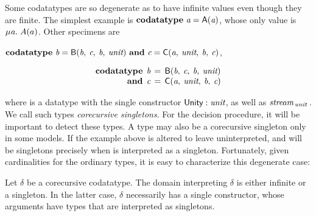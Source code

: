 Some codatatypes are so degenerate as to have infinite values
even though they are finite. The simplest example is
\vthinspace$\textbf{codatatype}~\textit{a} = \textsf{A}(\textit{a})$, whose
only value is $\MU a.\; A(a)$. Other specimens are
\begin{paper}%
\vthinspace$\textbf{codatatype}~\textit{b} = \textsf{B}(\textit{b},\: \textit{c},\: \textit{b},\: \textit{unit})
~\textbf{and}~ \textit{c} = \textsf{C}(\textit{a},\: \textit{unit},\: \textit{b},\: \textit{c})$,
\end{paper}%
\begin{report}%
\[\begin{aligned}[t]
      \textbf{codatatype}\;\, \textit{b} & \,=\, \textsf{B}(\textit{b},\: \textit{c},\: \textit{b},\: \textit{unit}) \\[-1\jot]
      \textbf{and}\;\, \textit{c} & \,=\, \textsf{C}(\textit{a},\: \textit{unit},\: \textit{b},\: \textit{c})
\end{aligned}
\]
\end{report}%
where  is a datatype with the single constructor $\textsf{Unity} :
\textit{unit}$, as well as $\textit{stream}_{\,\textit{unit}\,}$. We call such types
\emph{corecursive singletons}. For the decision procedure, it will be
important to detect these types. %
A type may also be a corecursive singleton only in some models. If the example
above is altered to leave  uninterpreted,  and  will be
singletons precisely when  is interpreted as a singleton.
Fortunately, given cardinalities for the ordinary types, it is easy to
characterize this degenerate case:


\begin{lemma}%
\label{lem:corecursive-singletons}%
\afterDot
Let $\delta$ be a corecursive codatatype. The domain interpreting $\delta$ is
either infinite or a singleton. In the latter case, $\delta$ necessarily has a
single constructor, whose arguments have types that are interpreted as
singletons.
\end{lemma}

